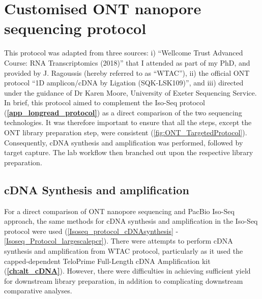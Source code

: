 \cleardoublepage
\chapter{Customised ONT nanopore sequencing protocol}
\label{app_longread_ont_protocol}

\stoptocwriting
This protocol was adapted from three sources: i) “Wellcome Trust Advanced Course: RNA Transcriptomics (2018)” that I attended as part of my PhD, and provided by J. Ragoussis (hereby referred to as “WTAC”), ii) the official ONT protocol “1D amplicon/cDNA by Ligation (SQK-LSK109)”, and iii) directed under the guidance of Dr Karen Moore, University of Exeter Sequencing Service. In brief, this protocol aimed to complement the Iso-Seq protocol (\textbf{\cref{app_longread_protocol}}) as a direct comparison of the two sequencing technologies. It was therefore important to ensure that all the steps, except the ONT library preparation step, were consistent (\cref{fig:ONT_TargetedProtocol}). Consequently, cDNA synthesis and amplification was performed, followed by target capture. The lab workflow then branched out upon the respective library preparation.   

\section{cDNA Synthesis and amplification}
For a direct comparison of ONT nanopore sequencing and PacBio Iso-Seq approach, the same methods for cDNA synthesis and amplification in the Iso-Seq protocol were used (\cref{Isoseq_protocol_cDNAsynthesis} - \cref{Isoseq_Protocol_largescalepcr}). There were attempts to perform cDNA synthesis and amplification from WTAC protocol, particularly as it used the capped-dependent TeloPrime Full-Length cDNA Amplification kit (\textbf{\cref{ch:alt_cDNA}}). However, there were difficulties in achieving sufficient yield for downstream library preparation, in addition to complicating downstream comparative analyses.



